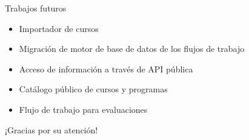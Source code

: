 \documentclass[10pt,xcolor=table]{beamer}
\begin{document}
\begin{frame}{Trabajos futuros}
	\begin{itemize}[<+- | alert@+>]
		\item Importador de cursos
	    \item Migración de motor de base de datos de los flujos de trabajo
	    \item Acceso de información a través de API pública
	    \item Catálogo público de cursos y programas
	    \item Flujo de trabajo para evaluaciones
	\end{itemize}
\end{frame}

\begin{frame}[standout]
  ¡Gracias por su atención!
\end{frame}
\end{document}
